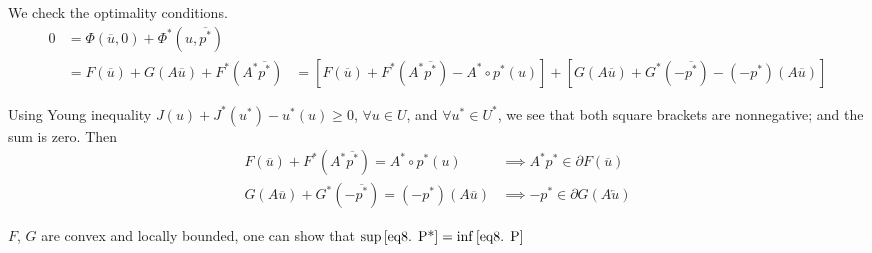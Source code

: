 We check the optimality conditions.
\begin{align*}
	0&=\Phi (\overline{u},0)+\Phi^*(u, \overline{p^*}) \\
	&= F(\overline{u})+G(A\overline{u})+F^*(A^*\overline{p^*})
	&= [F(\overline{u})+F^*(A^*\overline{p^*})-A^*\circ p^*(u)]+[G(A\overline{u})+G^*(-\overline{p^*})-(-p^*)(A\overline{u})]
\end{align*}

Using Young inequality $J(u)+J^*(u^*)-u^*(u)\geq 0$, $\forall u \in U$, and $\forall u^* \in U^*$, we see that both square brackets are nonnegative; and the sum is zero. Then
\begin{align*}
	F(\overline{u})+F^*(A^*\overline{p^*})=A^*\circ p^*(u) &\implies A^*p^* \in \partial F(\overline{u}) \\
	G(A\overline{u})+G^*(-\overline{p^*})=(-p^*)(A\overline{u}) &\implies -p^* \in \partial G(A\overleftarrow{u})
\end{align*}

$F$, $G$ are convex and locally bounded, one can show that 
$\sup\eqref{eq8. P*}=\inf\eqref{eq8. P}$